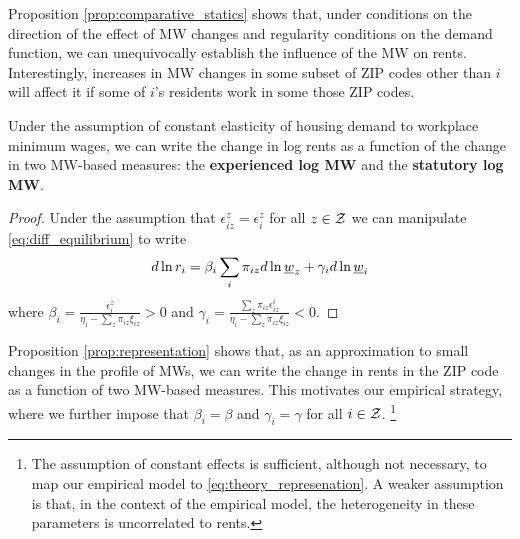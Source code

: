 Proposition \ref{prop:comparative_statics} shows that, under conditions on the 
direction of the effect of MW changes and regularity conditions on the demand 
function, we can unequivocally establish the influence of the MW on rents. 
Interestingly, increases in MW changes in some subset of ZIP codes other than $i$
will affect it if some of $i$'s residents work in some those ZIP codes.

\begin{prop}[Representation]\label{prop:representation}
    Under the assumption of constant elasticity of housing demand to workplace minimum 
    wages, we can write the change in log rents as a function of the change in two 
    MW-based measures: the \textbf{experienced log MW} and the \textbf{statutory 
    log MW}.
\end{prop}
\begin{proof}
    Under the assumption that $\epsilon_{iz}^z = \epsilon_i^z$ for all $z\in\mathcal{Z}$ we can 
    manipulate \eqref{eq:diff_equilibrium} to write
    \begin{equation} \label{eq:theory_represenation}
        d \ln r_i = \beta_i \sum_i \pi_{iz} d\ln \underline{w}_z + \gamma_i d \ln \underline{w}_i
    \end{equation}
    where $\beta_i = \frac{\epsilon_{i}^z}{\eta_{i} - \sum_z \pi_{iz} \xi_{iz}} 
    >0$ and $\gamma_i = \frac{\sum_z \pi_{iz} \epsilon_{iz}^i}{\eta_{i} 
            - \sum_z \pi_{iz} \xi_{iz}} < 0$.
\end{proof}

Proposition \ref{prop:representation} shows that, as an approximation to small changes 
in the profile of MWs, we can write the change in rents in the ZIP code as a function 
of two MW-based measures.
This motivates our empirical strategy, where we further impose that $\beta_i = \beta$ and 
$\gamma_i=\gamma$ for all $i\in\mathcal{Z}$.%
\footnote{The assumption of constant effects is sufficient, although not necessary, 
to map our empirical model to \eqref{eq:theory_represenation}. 
A weaker assumption is that, in the context of the empirical model, the heterogeneity
in these parameters is uncorrelated to rents.}
